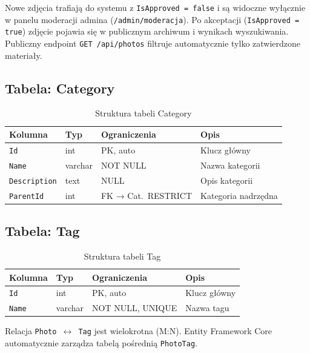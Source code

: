 \documentclass[12pt, a4paper]{article}
\begin{document}
Nowe zdjęcia trafiają do systemu z \texttt{IsApproved = false} i są widoczne wyłącznie
w panelu moderacji admina (\texttt{/admin/moderacja}). Po akceptacji (\texttt{IsApproved = true})
zdjęcie pojawia się w publicznym archiwum i wynikach wyszukiwania. Publiczny endpoint
\texttt{GET /api/photos} filtruje automatycznie tylko zatwierdzone materiały.

\subsection{Tabela: Category}

\begin{table}[H]
  \centering
  \caption{Struktura tabeli Category}
  \begin{tabular}{@{}L{3cm}L{2.5cm}L{3cm}L{5cm}@{}}
    \toprule
    \textbf{Kolumna} & \textbf{Typ} & \textbf{Ograniczenia} & \textbf{Opis} \\
    \midrule
    \texttt{Id}          & int     & PK, auto          & Klucz główny \\
    \texttt{Name}        & varchar & NOT NULL          & Nazwa kategorii \\
    \texttt{Description} & text    & NULL              & Opis kategorii \\
    \texttt{ParentId}    & int     & FK → Cat.\ RESTRICT & Kategoria nadrzędna \\
    \bottomrule
  \end{tabular}
\end{table}

\subsection{Tabela: Tag}

\begin{table}[H]
  \centering
  \caption{Struktura tabeli Tag}
  \begin{tabular}{@{}L{3cm}L{2.5cm}L{3cm}L{5cm}@{}}
    \toprule
    \textbf{Kolumna} & \textbf{Typ} & \textbf{Ograniczenia} & \textbf{Opis} \\
    \midrule
    \texttt{Id}   & int     & PK, auto       & Klucz główny \\
    \texttt{Name} & varchar & NOT NULL, UNIQUE & Nazwa tagu \\
    \bottomrule
  \end{tabular}
\end{table}

Relacja \texttt{Photo $\leftrightarrow$ Tag} jest wielokrotna (M:N).
Entity Framework Core automatycznie zarządza tabelą pośrednią \texttt{PhotoTag}.
\end{document}
